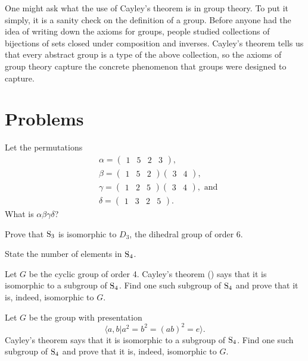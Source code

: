 One might ask what the use of Cayley's theorem is in group theory. To put it simply, it is a sanity check on the definition of a group. Before anyone had the idea of writing down the axioms for groups, people studied collections of bijections of sets closed under composition and inverses. Cayley's theorem tells us that every abstract group is a type of the above collection, so the axioms of group theory capture the concrete phenomenon that groups were designed to capture.



\section{Problems}
\begin{problem}
    Let the permutations
    \begin{align*}
        &\alpha = \begin{pmatrix}1 & 5 & 2 & 3\end{pmatrix},\\
        &\beta  = \begin{pmatrix}1 & 5 & 2\end{pmatrix}\begin{pmatrix}3 & 4\end{pmatrix},\\
        &\gamma = \begin{pmatrix}1 & 2 & 5\end{pmatrix}\begin{pmatrix}3 & 4\end{pmatrix}, \text{ and}\\
        &\delta = \begin{pmatrix}1 & 3 & 2 & 5\end{pmatrix}.
    \end{align*}
    What is $\alpha\beta\gamma\delta$?
\end{problem}

\begin{problem}
    Prove that $\mathrm{S}_{3}$ is isomorphic to $D_3$, the dihedral group of order 6.
\end{problem}

\begin{problem}
    State the number of elements in $\mathrm{S}_{4}$.
    \begin{partquestions}{\alph*}
        \item Let $G$ be the cyclic group of order 4. Cayley's theorem () says that it is isomorphic to a subgroup of $\mathrm{S}_{4}$. Find one such subgroup of $\mathrm{S}_{4}$ and prove that it is, indeed, isomorphic to $G$.
        \item Let $G$ be the group with presentation
        \[
            \langle a, b \vert a^2 = b^2 = (ab)^2 = e \rangle.
        \]
        Cayley's theorem says that it is isomorphic to a subgroup of $\mathrm{S}_{4}$. Find one such subgroup of $\mathrm{S}_{4}$ and prove that it is, indeed, isomorphic to $G$.
    \end{partquestions}
\end{problem}
